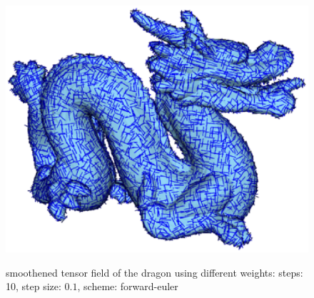 \documentclass[a4paper,10pt,notitlepage]{scrreprt}
\begin{document}
\begin{figure}
{    \includegraphics[scale=0.35]{img-2-2/dragon-t-10-01-mean-forwardeuler.eps}}
 \caption{smoothened tensor field of the dragon using different weights: steps:
10, step size: $0.1$, scheme: forward-euler}
 \label{fig:smooth-weights-curvature-tensor}
\end{figure}
\end{document}
